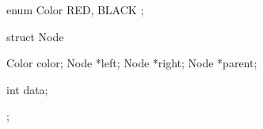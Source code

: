 enum Color { RED, BLACK };

struct Node {
    Color color;
    Node *left;
    Node *right;
    Node *parent;

    int data;
};
